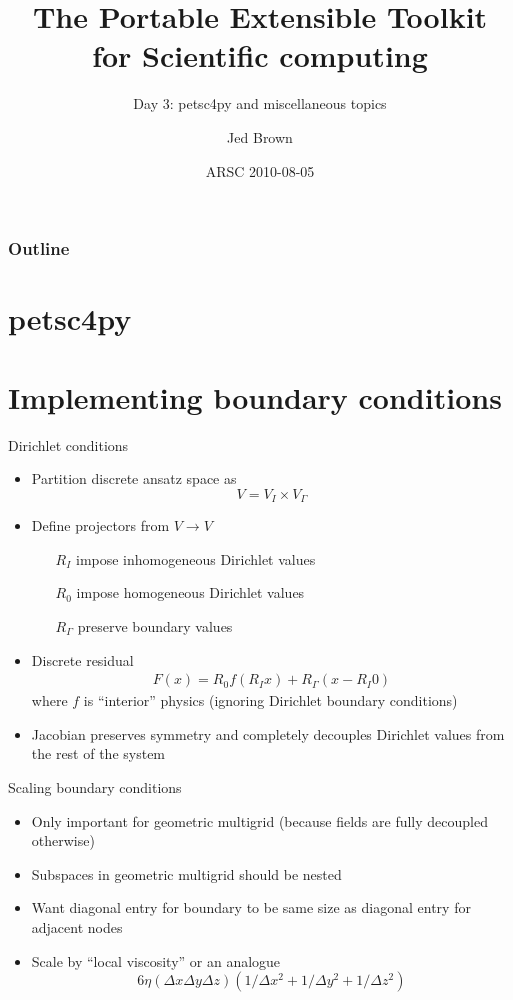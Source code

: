\documentclass{beamer}
\title[PETSc day 2]{The Portable Extensible Toolkit for Scientific computing}
\subtitle{Day 3: petsc4py and miscellaneous topics}
\author{Jed Brown}
\institute[ETH Z\"urich]
{

}
\date{ARSC 2010-08-05}
\begin{document}
\begin{frame}
\titlepage
\end{frame}

\begin{frame}
\frametitle{Outline}
\tableofcontents
\end{frame}


\section{petsc4py}




\section{Implementing boundary conditions}
\begin{frame}{Dirichlet conditions}
  \begin{itemize}
  \item Partition discrete ansatz space as
    \[ V = V_I \times V_\Gamma \]
  \item Define projectors from $V \to V$
    \begin{itemize}
    \item[$R_I$] impose inhomogeneous Dirichlet values
    \item[$R_0$] impose homogeneous Dirichlet values
    \item[$R_\Gamma$] preserve boundary values
    \end{itemize}
  \item Discrete residual
    \begin{gather*}
      F(x) = R_0 f(R_I x) + R_\Gamma (x - R_I 0)
    \end{gather*}
    where $f$ is ``interior'' physics (ignoring Dirichlet boundary conditions)
  \item Jacobian preserves symmetry and completely decouples Dirichlet
    values from the rest of the system
  \end{itemize}
\end{frame}

\begin{frame}{Scaling boundary conditions}
  \begin{itemize}
  \item Only important for geometric multigrid (because fields are fully decoupled otherwise)
  \item Subspaces in geometric multigrid should be nested
  \item Want diagonal entry for boundary to be same size as diagonal entry for adjacent nodes
  \item Scale by ``local viscosity'' or an analogue
    \[ 6 \eta (\Delta x \Delta y \Delta z)\left(1/\Delta x^2 + 1/\Delta y^2 + 1/\Delta z^2\right) \]
  \end{itemize}
\end{frame}
\end{document}
